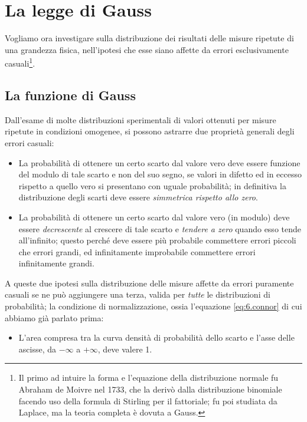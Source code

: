 
\chapter{La legge di Gauss}
Vogliamo ora investigare sulla distribuzione dei risultati
delle misure ripetute di una grandezza fisica, nell'ipotesi
che esse siano affette da errori esclusivamente
casuali\/\footnote{Il primo ad intuire la forma e
  l'equazione della distribuzione normale fu Abraham de
  Moivre%
  nel 1733, che la deriv\`o dalla distribuzione binomiale
  facendo uso della formula di Stirling per il fattoriale;
  fu poi studiata da Laplace,%
  ma la teoria completa \`e dovuta a Gauss.}.

\section{La funzione di Gauss}%
%
\label{ch:9.fungau}
Dall'esame di molte distribuzioni sperimentali di valori
ottenuti per misure ripetute in condizioni omogenee, si
possono astrarre due propriet\`a generali degli errori
casuali:
\begin{itemize}
\item La probabilit\`a di ottenere un certo scarto dal
  valore vero deve essere funzione del modulo di tale scarto
  e non del suo segno, se valori in difetto ed in eccesso
  rispetto a quello vero si presentano con uguale
  probabilit\`a; in definitiva la distribuzione degli scarti
  deve essere \emph{simmetrica rispetto allo zero}.
\item La probabilit\`a di ottenere un certo scarto dal
  valore vero (in modulo) deve essere \emph{decrescente} al
  crescere di tale scarto e \emph{tendere a zero} quando
  esso tende all'infinito; questo perch\'e deve essere pi\`u
  probabile commettere errori piccoli che errori grandi, ed
  infinitamente improbabile commettere errori infinitamente
  grandi.
\end{itemize}

A queste due ipotesi sulla distribuzione delle misure
affette da errori puramente casuali se ne pu\`o aggiungere
una terza, valida per \emph{tutte} le distribuzioni di
probabilit\`a; la condizione di normalizzazione,%
ossia l'equazione \eqref{eq:6.connor} di cui abbiamo gi\`a
parlato prima:
\begin{itemize}
\item L'area compresa tra la curva densit\`a di
  probabilit\`a dello scarto e l'asse delle ascisse, da
  $-\infty$ a $+\infty$, deve valere 1.
\end{itemize}


